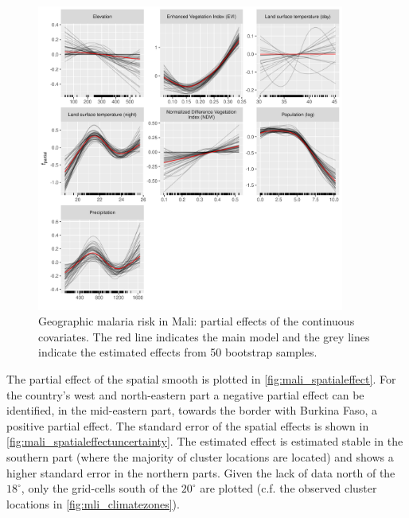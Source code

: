 \begin{figure}[!t]
	\centering
	\includegraphics[width=0.9\textwidth, keepaspectratio]{figures/mali_maineffects.png}
	\caption{Geographic malaria risk in Mali: partial effects of the continuous covariates. The red line indicates the main model and the grey lines indicate the estimated effects from 50 bootstrap samples.}
	\label{fig:mli_main_effects}
\end{figure}

The partial effect of the spatial smooth is plotted in \autoref{fig:mali_spatialeffect}. For the country's west and north-eastern part a negative partial effect can be identified, in the mid-eastern part, towards the border with Burkina Faso, a positive partial effect. The standard error of the spatial effects is shown in \autoref{fig:mali_spatialeffectuncertainty}. The estimated effect is estimated stable in the southern part (where the majority of cluster locations are located) and shows a higher standard error in the northern parts. Given the lack of data north of the $18^\circ$, only the grid-cells south of the $20^\circ$ are plotted (c.f. the observed cluster locations in \autoref{fig:mli_climatezones}).

